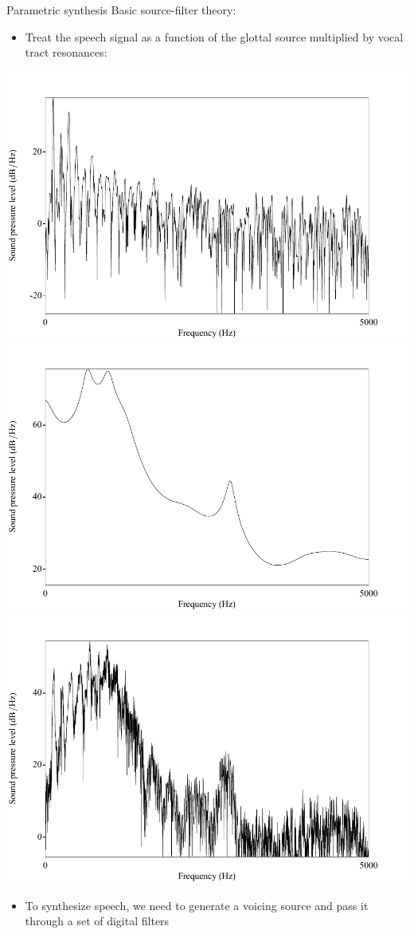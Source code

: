 \documentclass{beamer}
\begin{document}
\begin{frame}{Parametric synthesis}
Basic source-filter theory:
\begin{itemize}
\item{Treat the speech signal as a function of the glottal source multiplied by vocal tract resonances:}
\end{itemize}
\includegraphics[scale=0.225,keepaspectratio]{aa_source.pdf}
\includegraphics[scale=0.225,keepaspectratio]{aa_filter.pdf}
\includegraphics[scale=0.225,keepaspectratio]{aa_conv.pdf}
\begin{itemize}
\item{To synthesize speech, we need to generate a voicing source and pass it through a set of digital filters}
\end{itemize}
\end{frame}
\end{document}

